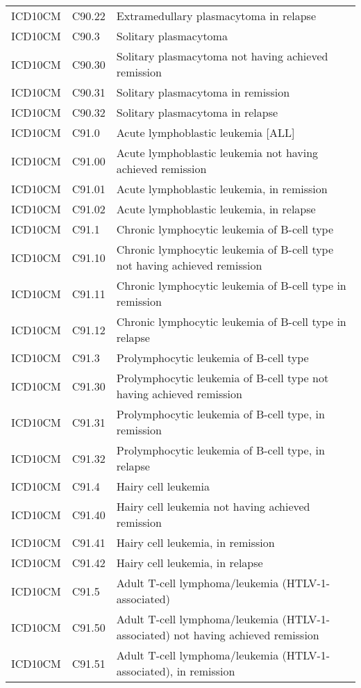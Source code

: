\begin{longtable}{p{}p{}p{}}
  ICD10CM & C90.22 & Extramedullary plasmacytoma in relapse \\ 
  ICD10CM & C90.3 & Solitary plasmacytoma \\ 
  ICD10CM & C90.30 & Solitary plasmacytoma not having achieved remission \\ 
  ICD10CM & C90.31 & Solitary plasmacytoma in remission \\ 
  ICD10CM & C90.32 & Solitary plasmacytoma in relapse \\ 
  ICD10CM & C91.0 & Acute lymphoblastic leukemia [ALL] \\ 
  ICD10CM & C91.00 & Acute lymphoblastic leukemia not having achieved remission \\ 
  ICD10CM & C91.01 & Acute lymphoblastic leukemia, in remission \\ 
  ICD10CM & C91.02 & Acute lymphoblastic leukemia, in relapse \\ 
  ICD10CM & C91.1 & Chronic lymphocytic leukemia of B-cell type \\ 
  ICD10CM & C91.10 & Chronic lymphocytic leukemia of B-cell type not having achieved remission \\ 
  ICD10CM & C91.11 & Chronic lymphocytic leukemia of B-cell type in remission \\ 
  ICD10CM & C91.12 & Chronic lymphocytic leukemia of B-cell type in relapse \\ 
  ICD10CM & C91.3 & Prolymphocytic leukemia of B-cell type \\ 
  ICD10CM & C91.30 & Prolymphocytic leukemia of B-cell type not having achieved remission \\ 
  ICD10CM & C91.31 & Prolymphocytic leukemia of B-cell type, in remission \\ 
  ICD10CM & C91.32 & Prolymphocytic leukemia of B-cell type, in relapse \\ 
  ICD10CM & C91.4 & Hairy cell leukemia \\ 
  ICD10CM & C91.40 & Hairy cell leukemia not having achieved remission \\ 
  ICD10CM & C91.41 & Hairy cell leukemia, in remission \\ 
  ICD10CM & C91.42 & Hairy cell leukemia, in relapse \\ 
  ICD10CM & C91.5 & Adult T-cell lymphoma/leukemia (HTLV-1-associated) \\ 
  ICD10CM & C91.50 & Adult T-cell lymphoma/leukemia (HTLV-1-associated) not having achieved remission \\ 
  ICD10CM & C91.51 & Adult T-cell lymphoma/leukemia (HTLV-1-associated), in remission \\ 

\end{longtable}
